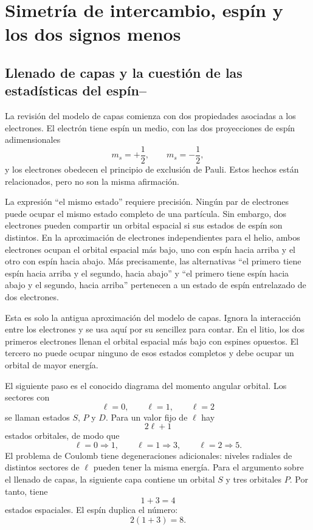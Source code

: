 \chapter{Simetría de intercambio, espín y los dos signos menos}

\section{Llenado de capas y la cuestión de las estadísticas del espín--}

La revisión del modelo de capas comienza con dos propiedades asociadas a los electrones. El electrón tiene espín un medio, con las dos proyecciones de espín adimensionales
\begin{equation}
m_s=+\frac12,
\qquad
m_s=-\frac12,
\end{equation}
y los electrones obedecen el principio de exclusión de Pauli. Estos hechos están relacionados, pero no son la misma afirmación.

La expresión ``el mismo estado'' requiere precisión. Ningún par de electrones puede ocupar el mismo estado completo de una partícula. Sin embargo, dos electrones pueden compartir un orbital espacial si sus estados de espín son distintos. En la aproximación de electrones independientes para el helio, ambos electrones ocupan el orbital espacial más bajo, uno con espín hacia arriba y el otro con espín hacia abajo. Más precisamente, las alternativas ``el primero tiene espín hacia arriba y el segundo, hacia abajo'' y ``el primero tiene espín hacia abajo y el segundo, hacia arriba'' pertenecen a un estado de espín entrelazado de dos electrones.

Esta es solo la antigua aproximación del modelo de capas. Ignora la interacción entre los electrones y se usa aquí por su sencillez para contar. En el litio, los dos primeros electrones llenan el orbital espacial más bajo con espines opuestos. El tercero no puede ocupar ninguno de esos estados completos y debe ocupar un orbital de mayor energía.

El siguiente paso es el conocido diagrama del momento angular orbital. Los sectores con
\begin{equation}
\ell=0,\qquad \ell=1,\qquad \ell=2
\end{equation}
se llaman estados \(S\), \(P\) y \(D\). Para un valor fijo de \(\ell\) hay
\begin{equation}
2\ell+1
\end{equation}
estados orbitales, de modo que
\begin{equation}
\ell=0\Rightarrow 1,
\qquad
\ell=1\Rightarrow 3,
\qquad
\ell=2\Rightarrow 5.
\end{equation}
El problema de Coulomb tiene degeneraciones adicionales: niveles radiales de distintos sectores de \(\ell\) pueden tener la misma energía. Para el argumento sobre el llenado de capas, la siguiente capa contiene un orbital \(S\) y tres orbitales \(P\). Por tanto, tiene
\begin{equation}
1+3=4
\end{equation}
estados espaciales. El espín duplica el número:
\begin{equation}
2(1+3)=8.
\end{equation}

